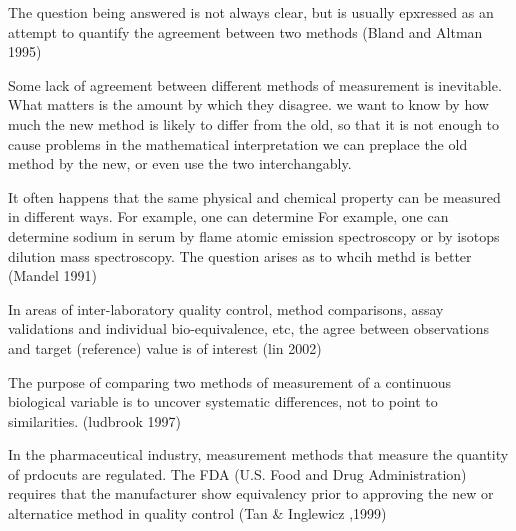 The  question being answered is not always clear, but is usually epxressed as an attempt to quantify the agreement
between two methods (Bland and Altman 1995)

Some lack of agreement between different methods of measurement is inevitable. What matters is the amount by which they
disagree. we want to know by how much the new method is likely to differ from the old, so that it is not enough to cause
problems in the mathematical interpretation we can preplace the old method by the new, or even use the two interchangably.


It often happens that the same physical and chemical property can be measured in different ways. For example, one can determine
For example, one can determine sodium in serum by flame atomic emission spectroscopy or by isotops dilution mass spectroscopy. The question arises as to whcih methd is better (Mandel 1991)

In areas of inter-laboratory quality control, method comparisons, assay validations and individual bio-equivalence, etc, the agree between observations and target (reference) value is
of interest (lin 2002)

The purpose of comparing two methods of measurement of a continuous biological variable is to uncover systematic differences, not to point to
similarities. (ludbrook 1997)

In the pharmaceutical industry, measurement methods that measure the quantity of prdocuts are regulated. The FDA (U.S. Food and
Drug Administration) requires that the manufacturer show equivalency prior to approving the new or alternatice method in quality control (Tan \& Inglewicz ,1999)
